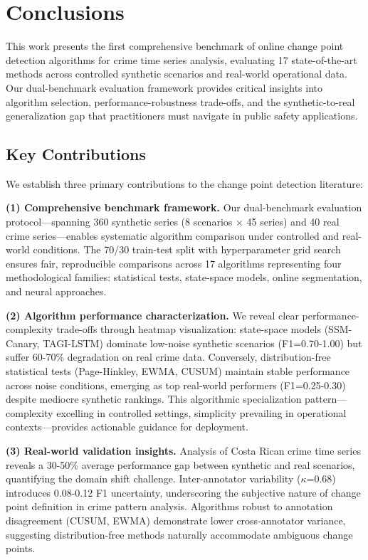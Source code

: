 \section{Conclusions}
\label{sec:conclusions}

This work presents the first comprehensive benchmark of online change point detection algorithms for crime time series analysis, evaluating 17 state-of-the-art methods across controlled synthetic scenarios and real-world operational data. Our dual-benchmark evaluation framework provides critical insights into algorithm selection, performance-robustness trade-offs, and the synthetic-to-real generalization gap that practitioners must navigate in public safety applications.

\subsection{Key Contributions}

We establish three primary contributions to the change point detection literature:

\textbf{(1) Comprehensive benchmark framework.} Our dual-benchmark evaluation protocol—spanning 360 synthetic series (8 scenarios × 45 series) and 40 real crime series—enables systematic algorithm comparison under controlled and real-world conditions. The 70/30 train-test split with hyperparameter grid search ensures fair, reproducible comparisons across 17 algorithms representing four methodological families: statistical tests, state-space models, online segmentation, and neural approaches.

\textbf{(2) Algorithm performance characterization.} We reveal clear performance-complexity trade-offs through heatmap visualization: state-space models (SSM-Canary, TAGI-LSTM) dominate low-noise synthetic scenarios (F1=0.70-1.00) but suffer 60-70\% degradation on real crime data. Conversely, distribution-free statistical tests (Page-Hinkley, EWMA, CUSUM) maintain stable performance across noise conditions, emerging as top real-world performers (F1=0.25-0.30) despite mediocre synthetic rankings. This algorithmic specialization pattern—complexity excelling in controlled settings, simplicity prevailing in operational contexts—provides actionable guidance for deployment.

\textbf{(3) Real-world validation insights.} Analysis of Costa Rican crime time series reveals a 30-50\% average performance gap between synthetic and real scenarios, quantifying the domain shift challenge. Inter-annotator variability ($\kappa$=0.68) introduces 0.08-0.12 F1 uncertainty, underscoring the subjective nature of change point definition in crime pattern analysis. Algorithms robust to annotation disagreement (CUSUM, EWMA) demonstrate lower cross-annotator variance, suggesting distribution-free methods naturally accommodate ambiguous change points.


